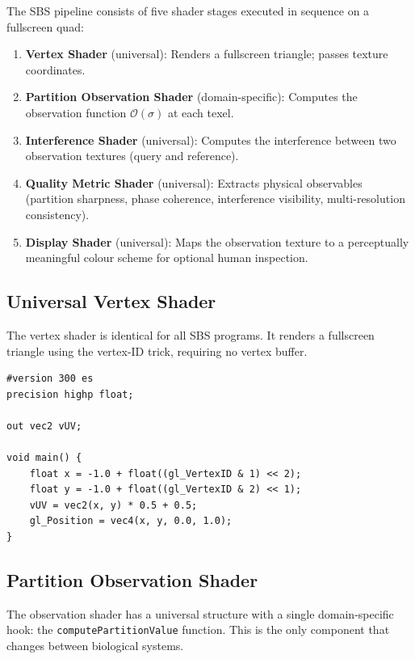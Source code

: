 \documentclass[11pt,twocolumn,a4paper]{article}
\newcommand{\Obs}{\mathcal{O}}
\begin{document}
The SBS pipeline consists of five shader stages executed in sequence
on a fullscreen quad:

\begin{enumerate}[leftmargin=*,itemsep=2pt]
\item \textbf{Vertex Shader} (universal): Renders a fullscreen
  triangle; passes texture coordinates.
\item \textbf{Partition Observation Shader} (domain-specific):
  Computes the observation function $\Obs(\sigma)$ at each texel.
\item \textbf{Interference Shader} (universal): Computes the
  interference between two observation textures (query and reference).
\item \textbf{Quality Metric Shader} (universal): Extracts physical
  observables (partition sharpness, phase coherence, interference
  visibility, multi-resolution consistency).
\item \textbf{Display Shader} (universal): Maps the observation
  texture to a perceptually meaningful colour scheme for optional
  human inspection.
\end{enumerate}

\subsection{Universal Vertex Shader}

The vertex shader is identical for all SBS programs.  It renders a
fullscreen triangle using the vertex-ID trick, requiring no vertex
buffer.

\begin{lstlisting}[style=glsl,caption={SBS Universal Vertex Shader.}]
#version 300 es
precision highp float;

out vec2 vUV;

void main() {
    float x = -1.0 + float((gl_VertexID & 1) << 2);
    float y = -1.0 + float((gl_VertexID & 2) << 1);
    vUV = vec2(x, y) * 0.5 + 0.5;
    gl_Position = vec4(x, y, 0.0, 1.0);
}
\end{lstlisting}

\subsection{Partition Observation Shader}

The observation shader has a universal structure with a single
domain-specific hook: the \texttt{computePartitionValue} function.
This is the only component that changes between biological systems.
\end{document}
